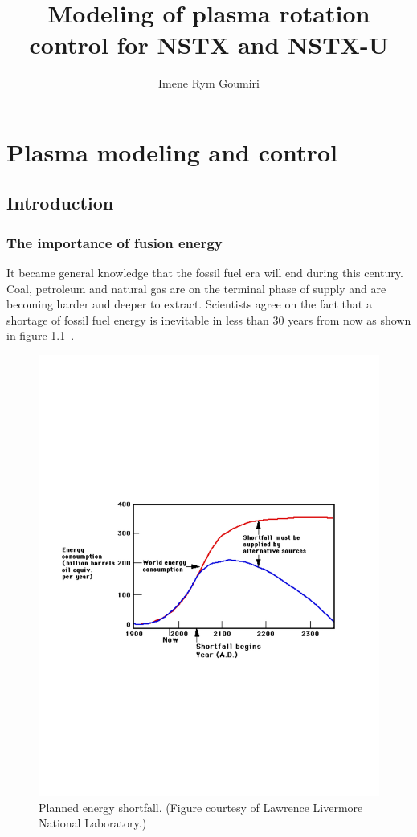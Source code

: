 \documentclass[12pt,lot, lof]{puthesis}
\title{Modeling of plasma rotation control for NSTX and NSTX-U}
\author{Imene Rym Goumiri}
\begin{document}
\makefrontmatter


%
\part{Plasma modeling and control}
\chapter{Introduction}

\section{The importance of fusion energy}

It became general knowledge that the fossil fuel era will end during this century. Coal, petroleum and natural gas are on the terminal phase of supply and are becoming harder and deeper to extract. Scientists agree on the fact that a shortage of fossil fuel energy is inevitable in less than 30 years from now as shown in figure \ref{projected_energy_shortfall}~\cite{GIEC}.

\begin{figure}
\centering
\includegraphics[width=\linewidth]{projected_energy_shortfall.pdf}
\caption{Planned energy shortfall. (Figure courtesy of Lawrence Livermore National Laboratory.)}
\label{projected_energy_shortfall}
\end{figure}
\end{document}
